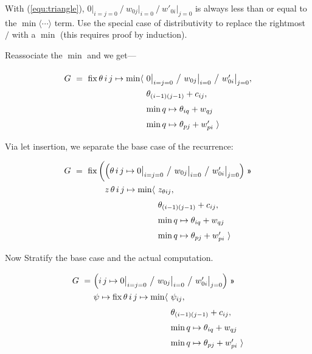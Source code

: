\documentclass{article}
\begin{document}
With (\ref{equ:triangle}), $0\big|_{i=j=0} ~\big/~ w_{0j}\big|_{i=0} ~\big/~ w'_{0i}\big|_{j=0}$
is always less than or equal to the $\min\langle\cdots\rangle$ term. Use the special case of distributivity
to replace the rightmost $/$ with a $\min$ (this requires proof by induction).

Reassociate the $\min$ and we get---

\[
\renewcommand\arraystretch{1.5}
\begin{array}{l@{~}l}
G ~=~ \mathrm{fix}\, \theta\,i\,j \mapsto \min\langle 
                & 0\big|_{i=j=0} ~\big/~ w_{0j}\big|_{i=0} ~\big/~ w'_{0i}\big|_{j=0}, \\
                & \theta_{(i-1)(j-1)} + c_{ij}, \\
                & \min q\mapsto \theta_{iq} + w_{qj} \\
                & \min q\mapsto \theta_{pj} + w'_{pi}~\rangle
\end{array}
\]

Via let insertion, we separate the base case of the recurrence:

\newcommand\lspan[2]{\multicolumn{#1}{@{}l}{#2}}


\[
\renewcommand\arraystretch{1.5}
\begin{array}{l@{}l@{~}l}
G ~=~ \mathrm{fix}\,\bigg(
      & \lspan2{\Big( \theta\,i\,j \mapsto 0\big|_{i=j=0} ~\big/~ w_{0j}\big|_{i=0} ~\big/~ w'_{0i}\big|_{j=0} \Big) ~\applt } \\
      & z\, \theta\,i\,j \mapsto \min\langle 
                 & z_{\theta ij}, \\
      &          & \theta_{(i-1)(j-1)} + c_{ij}, \\
      &          & \min q\mapsto \theta_{iq} + w_{qj} \\
      &          & \min q\mapsto \theta_{pj} + w'_{pi}~\rangle
\end{array}
\]

\medskip
Now Stratify the base case and the actual computation.

\[
\renewcommand\arraystretch{1.5}
\begin{array}{l@{}l@{~}l}
G ~=~ & \lspan2{\Big( i\,j \mapsto 0\big|_{i=j=0} ~\big/~ w_{0j}\big|_{i=0} ~\big/~ w'_{0i}\big|_{j=0} \Big) ~\applt } \\
      & \psi\mapsto \mathrm{fix}\, \theta\,i\,j \mapsto \min\langle 
                 & \psi_{ij}, \\
      &          & \theta_{(i-1)(j-1)} + c_{ij}, \\
      &          & \min q\mapsto \theta_{iq} + w_{qj} \\
      &          & \min q\mapsto \theta_{pj} + w'_{pi}~\rangle
\end{array}
\]
\end{document}
